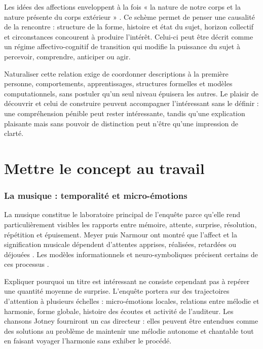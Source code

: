 \documentclass[11pt,a4paper]{article}
\begin{document}
Les idées des affections enveloppent à la fois « la nature de notre corps et la
nature présente du corps extérieur »
\parencite[III, prop. XXVII, dém.]{spinoza1861oeuvres}. Ce schème permet de
penser une causalité de la rencontre : structure de la forme, histoire et état
du sujet, horizon collectif et circonstances concourent à produire l'intérêt.
Celui-ci peut être décrit comme un régime affectivo-cognitif de transition qui
modifie la puissance du sujet à percevoir, comprendre, anticiper ou agir.

Naturaliser cette relation exige de coordonner descriptions à la première
personne, comportements, apprentissages, structures formelles et modèles
computationnels, sans postuler qu'un seul niveau épuisera les autres. Le plaisir
de découvrir et celui de construire
\parencite{feynman1999pleasure,florman1996existential} peuvent accompagner
l'intéressant sans le définir : une compréhension pénible peut rester
intéressante, tandis qu'une explication plaisante mais sans pouvoir de
distinction peut n'être qu'une impression de clarté.

\part{Mettre le concept au travail}

\section{La musique : temporalité et micro-émotions}

La musique constitue le laboratoire principal de l'enquête parce qu'elle rend
particulièrement visibles les rapports entre mémoire, attente, surprise,
résolution, répétition et épuisement. Meyer puis Narmour ont montré que l'affect
et la signification musicale dépendent d'attentes apprises, réalisées, retardées
ou déjouées
\parencite{meyer1956emotion,narmour1990basic,narmour1992complexity}. Les modèles
informationnels et neuro-symboliques précisent certains de ces processus
\parencite{abdallah2009information,berger1999expectations,gang1999unified}.

Expliquer pourquoi un titre est intéressant ne consiste cependant pas à repérer
une quantité moyenne de surprise. L'enquête portera sur des trajectoires
d'attention à plusieurs échelles : micro-émotions locales, relations entre
mélodie et harmonie, forme globale, histoire des écoutes et activité de
l'auditeur. Les chansons Jotney fourniront un cas directeur : elles peuvent être
entendues comme des solutions au problème de maintenir une mélodie autonome et
chantable tout en faisant voyager l'harmonie sans exhiber le procédé.
\end{document}
